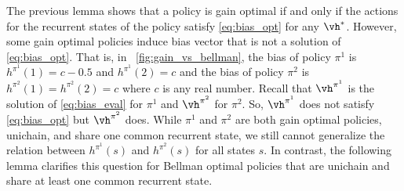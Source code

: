 The previous lemma shows that a policy is gain optimal if and only if the actions for the recurrent states of the policy satisfy \eqref{eq:bias_opt} for any $\vh^*$. %
However, some gain optimal policies induce bias vector that is not a solution of \eqref{eq:bias_opt}.
That is, in \figurename~\ref{fig:gain_vs_bellman}, the bias of policy $\pi^1$ is $h^{\pi^1}(1)=c-0.5$ and $h^{\pi^1}(2)=c$ and the bias of policy $\pi^2$ is $h^{\pi^2}(1)=h^{\pi^2}(2)=c$ where $c$ is any real number.
Recall that $\vh^{\pi^1}$ is the solution of \eqref{eq:bias_eval} for $\pi^1$ and $\vh^{\pi^2}$ for $\pi^2$.
So, $\vh^{\pi^1}$ does not satisfy \eqref{eq:bias_opt} but $\vh^{\pi^2}$ does.
While $\pi^1$ and $\pi^2$ are both gain optimal policies, unichain, and share one common recurrent state, we still cannot generalize the relation between $h^{\pi^1}(s)$ and $h^{\pi^2}(s)$ for all states $s$.
In contrast, the following lemma clarifies this question for Bellman optimal policies that are unichain and share at least one common recurrent state.

